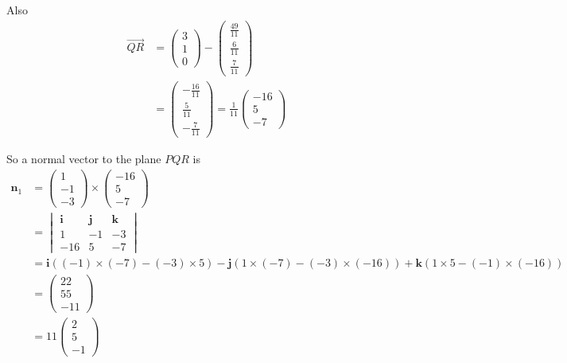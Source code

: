 \documentclass[leqno]{article}
\begin{document}
\begin{enumerate}[
  label=\textbf{\arabic*.},
  leftmargin=*,
  topsep=0pt,
  partopsep=0pt,
  parsep=0pt
]
\begin{djsSolution}
\begin{enumerate}[label=\textbf{(\alph*)}]
Also
\begin{align*}
\overrightarrow{QR}
&=
\begin{pmatrix}3\\1\\0\end{pmatrix}
-
\begin{pmatrix}\frac{49}{11}\\[2pt]\frac{6}{11}\\[2pt]\frac{7}{11}\end{pmatrix}\\
&=
\begin{pmatrix}
-\frac{16}{11}\\[2pt]
\frac{5}{11}\\[2pt]
-\frac{7}{11}
\end{pmatrix}
=
\frac{1}{11}
\begin{pmatrix}
-16\\5\\-7
\end{pmatrix}
\end{align*}

So a normal vector to the plane \(PQR\) is
\begin{align*}
\mathbf n_1
&=
\begin{pmatrix}1\\-1\\-3\end{pmatrix}
\times
\begin{pmatrix}-16\\5\\-7\end{pmatrix}\\
&=
\begin{vmatrix}
\mathbf i & \mathbf j & \mathbf k\\
1 & -1 & -3\\
-16 & 5 & -7
\end{vmatrix}\\
&=\mathbf i((-1)\times(-7)-(-3)\times 5)-\mathbf j(1\times(-7)-(-3)\times(-16))+\mathbf k(1\times 5-(-1)\times(-16))\\
&=
\begin{pmatrix}
22\\55\\-11
\end{pmatrix}\\
&=
11\begin{pmatrix}2\\5\\-1\end{pmatrix}
\end{align*}


\end{enumerate}
\end{djsSolution}
\end{enumerate}
\end{document}
